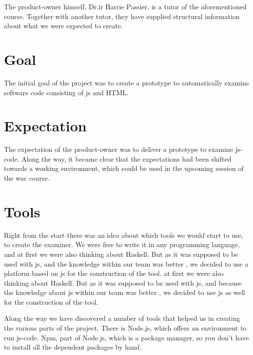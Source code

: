 The product-owner himself, Dr.ir Harrie Passier, is a tutor of the aforementioned course.
Together with another tutor, they have supplied structural information about
what we were expected to create.


\section{Goal}
The initial goal of the project was to create a prototype to automatically examine
software code consisting of \gls{js} and HTML.

\section{Expectation}

The expectation of the product-owner was to deliver a prototype to examine \gls{js-code}.
Along the way, it became clear that the expectations had been shifted towards a working environment, which could be used in the upcoming session of the \gls{wac} course.

\section{Tools}

Right from the start there was an idea about which tools we would start to use, to create the examiner. We were free to write it in any programming language, and
at first we were also thinking about Haskell.			
But as it was supposed to be used with \gls{js}, and the knowledge within our
team was better 
, we decided to use a platform based on \gls{js} for the construction of the tool. 
at first we were also thinking about Haskell.
But as it was supposed to be used with \gls{js}, and because the knowledge about \gls{js} within our
team was better %
, we decided to use \gls{js} as well for the construction of the tool.

Along the way we have discovered a number of tools that helped us in creating the various parts of the project.
There is Node.js, which offers an environment to run \gls{js-code}.
Npm, part of Node.js, which is a package manager, so you don't have to install
all the dependent packages by hand.


